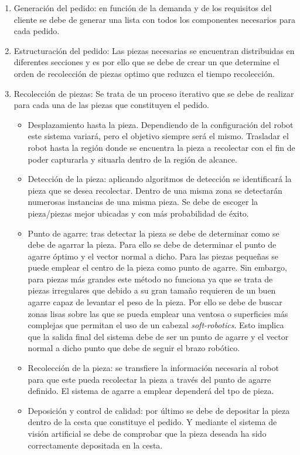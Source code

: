 \begin{enumerate}
\item Generación del pedido: en función de la demanda y de los requisitos del cliente se debe de generar una lista con todos los componentes necesarios para cada pedido.
\item Estructuración del pedido: Las piezas necesarias se encuentran distribuidas en diferentes secciones y es por ello que se debe de crear un  que determine el orden de recolección de piezas optimo que reduzca el tiempo recolección.
\item Recolección de piezas: Se trata de un proceso iterativo que se debe de realizar para cada una de las piezas que constituyen el pedido.
\begin{itemize}
\item Desplazamiento hasta la pieza. Dependiendo de la configuración del robot este sistema variará, pero el objetivo siempre será el mismo. Trasladar el robot hasta la región donde se encuentra la pieza a recolectar con el fin de poder capturarla y situarla dentro de la región de alcance.
\item Detección de la pieza: aplicando algoritmos de detección se identificará la pieza que se desea recolectar. Dentro de una misma zona se detectarán numerosas instancias de una misma pieza. Se debe de escoger la pieza/piezas mejor ubicadas y con más probabilidad de éxito.
\item Punto de agarre: tras detectar la pieza se debe de determinar como se debe de agarrar la pieza. Para ello se debe de determinar el punto de agarre óptimo y el vector normal a dicho. Para las piezas pequeñas se puede emplear el centro de la pieza como punto de agarre. Sin embargo, para piezas más grandes este método no funciona ya que se trata de piezas irregulares que debido a su gran tamaño requieren de un buen agarre capaz de levantar el peso de la pieza. Por ello se debe de buscar zonas lisas sobre las que se pueda emplear una ventosa o superficies más complejas que permitan el uso de un cabezal \textit{soft-robotics}. Esto implica que la salida final del sistema debe de ser un punto de agarre y el vector normal a dicho punto que debe de seguir el brazo robótico.
\item Recolección de la pieza: se transfiere la información necesaria al robot para que este pueda recolectar la pieza a través del punto de agarre definido. El sistema de agarre a emplear dependerá del tpo de pieza.
\item Deposición y control de calidad: por último se debe de depositar la pieza dentro de la cesta que constituye el pedido. Y mediante el sistema de visión artificial se debe de comprobar que la pieza deseada ha sido correctamente depositada en la cesta.

\end{itemize}
\end{enumerate}
